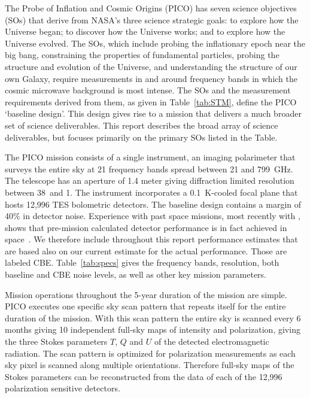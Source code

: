 \documentclass[PICOReport.tex]{subfiles}
\begin{document}
 
 
The Probe of Inflation and Cosmic Origins (PICO) has seven science objectives (SOs) that derive from NASA's three science strategic goals: to explore how the Universe began; to discover how the Universe works; and to explore how the Universe evolved. The \ac{SOs}, which include probing the inflationary epoch near the big bang, constraining the properties of fundamental particles, probing the structure and evolution of the Universe, and understanding the structure of our own Galaxy, require measurements in and around frequency bands in which the cosmic microwave background is most intense. The \ac{SOs} and the measurement requirements derived from them, as given in Table~\ref{tab:STM}, define the PICO `baseline design'. This design gives rise to a mission that delivers a much broader set of science deliverables.  This report describes the broad array of science deliverables, but focuses primarily on the primary \ac{SOs} listed in the Table. 

The PICO mission consists of a single instrument, an imaging polarimeter that surveys the entire sky at 21 frequency bands spread between 21 and 799~GHz.  The telescope has an aperture of 1.4 meter giving diffraction limited resolution between 38\arcmin\ and 1\arcmin . The instrument incorporates a 0.1~K-cooled focal plane that hosts 12,996 \ac{TES} bolometric detectors. The baseline design contains a margin of 40\% in detector noise. Experience with past space missions, most recently with \planck , shows that pre-mission calculated detector performance is in fact achieved in space~\cite{planck1101.2038,planck1101.2039}. We therefore include throughout this report performance estimates that are based also on our current estimate for the actual performance. Those are labeled \ac{CBE}. Table~\ref{tab:specs} gives the frequency bands, resolution, both baseline and \ac{CBE} noise levels, as well as other key mission parameters. 

Mission operations throughout the 5-year duration of the mission are simple. PICO executes one specific sky scan pattern that repeats itself for the entire duration of the mission. With this scan pattern the entire sky is scanned every 6 months giving 10 independent full-sky maps of intensity and polarization, giving the three Stokes parameters $T$, $Q$ and $U$ of the detected electromagnetic radiation.  The scan pattern is optimized for polarization measurements as each sky pixel is scanned along multiple orientations. Therefore full-sky maps of the Stokes parameters can be reconstructed from the data of each of the 12,996 polarization sensitive detectors.
\end{document}
